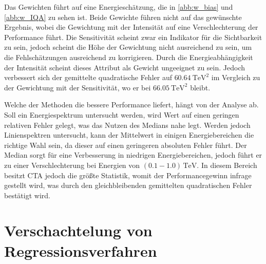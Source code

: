 Das Gewichten führt auf eine Energieschätzung, die in \autoref{abb:w_bias} und \autoref{abb:w_IQA} zu sehen ist.
Beide Gewichte führen nicht auf das gewünschte Ergebnis, wobei die Gewichtung mit der Intensität auf eine Verschlechterung der Performance führt.
Die Sensitivität scheint zwar ein Indikator für die Sichtbarkeit zu sein, jedoch scheint die Höhe der Gewichtung nicht ausreichend zu sein, um
die Fehlschätzungen ausreichend zu korrigieren.
Durch die Energieabhängigkeit der Intensität scheint dieses Attribut als Gewicht ungeeignet zu sein.
Jedoch verbessert sich der gemittelte quadratische Fehler auf $\SI{60.64}{\tera\eV\squared}$ im Vergleich zu der Gewichtung mit der Sensitivität, wo er bei
$\SI{66.05}{\tera\eV\squared}$ bleibt.

Welche der Methoden die bessere Performance liefert, hängt von der Analyse ab.
Soll ein Energiespektrum untersucht werden, wird Wert auf einen geringen relativen Fehler gelegt, was das Nutzen des Medians nahe legt.
Werden jedoch Linienspektren untersucht, kann der Mittelwert in einigen Energiebereichen die richtige Wahl sein, da dieser auf einen geringeren
absoluten Fehler führt.
Der Median sorgt für eine Verbesserung in niedrigen Energiebereichen, jedoch führt er zu einer Verschlechterung bei Energien von $(\num{0.1}-\num{1.0})\,\si{\tera\eV}$.
In diesem Bereich besitzt CTA jedoch die größte Statistik, womit der Performancegewinn infrage gestellt wird, was durch den
gleichbleibenden gemittelten quadratischen Fehler bestätigt wird.


\section{Verschachtelung von Regressionsverfahren}
\label{sec:nest}

